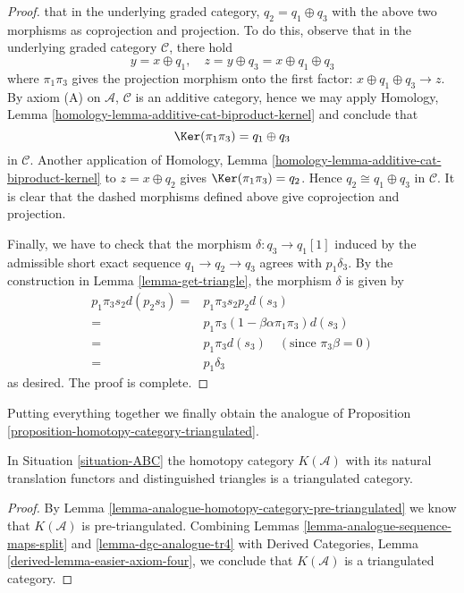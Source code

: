 \begin{proof}
that in the underlying graded category, $q_2 = q_1\oplus q_3$
with the above two morphisms as coprojection and projection.
To do this, observe that in the underlying graded category
$\mathcal{C}$, there hold
$$
y = x\oplus q_1,\quad
z = y\oplus q_3 = x\oplus q_1\oplus q_3
$$
where $\pi_1\pi_3$ gives the projection morphism onto the first
factor: $x\oplus q_1\oplus q_3\to z$. By axiom (A) on
$\mathcal{A}$, $\mathcal{C}$ is an additive category, hence
we may apply
Homology, Lemma \ref{homology-lemma-additive-cat-biproduct-kernel}
and conclude that
$$
\Ker(\pi_1\pi_3) = q_1\oplus q_3
$$
in $\mathcal{C}$. Another application of
Homology, Lemma \ref{homology-lemma-additive-cat-biproduct-kernel}
to $z = x\oplus q_2$ gives $\Ker(\pi_1\pi_3) = q_2$.
Hence $q_2\cong q_1\oplus q_3$ in $\mathcal{C}$.
It is clear that the dashed morphisms defined above give
coprojection and projection.

\medskip\noindent
Finally, we have to check that the morphism
$\delta : q_3 \to q_1[1]$ induced by the admissible
short exact sequence $q_1\to q_2\to q_3$ agrees with
$p_1\delta_3$. By the construction in
Lemma \ref{lemma-get-triangle}, the morphism $\delta$ is given by
\begin{align*}
p_1\pi_3s_2d(p_2s_3)
= &
p_1\pi_3s_2p_2d(s_3) \\
= &
p_1\pi_3(1-\beta\alpha\pi_1\pi_3)d(s_3) \\
= &
p_1\pi_3d(s_3)\quad (\text{since }\pi_3\beta = 0) \\
= &
p_1\delta_3
\end{align*}
as desired. The proof is complete.
\end{proof}

\noindent
Putting everything together we finally obtain the analogue
of Proposition \ref{proposition-homotopy-category-triangulated}.

\begin{proposition}
\label{proposition-ABC-homotopy-category-triangulated}
In Situation \ref{situation-ABC} the homotopy category $K(\mathcal{A})$
with its natural translation functors and distinguished triangles is a
triangulated category.
\end{proposition}

\begin{proof}
By Lemma \ref{lemma-analogue-homotopy-category-pre-triangulated} we know that
$K(\mathcal{A})$ is pre-triangulated. Combining
Lemmas \ref{lemma-analogue-sequence-maps-split} and
\ref{lemma-dgc-analogue-tr4} with
Derived Categories, Lemma \ref{derived-lemma-easier-axiom-four},
we conclude that $K(\mathcal{A})$ is a triangulated category.
\end{proof}

